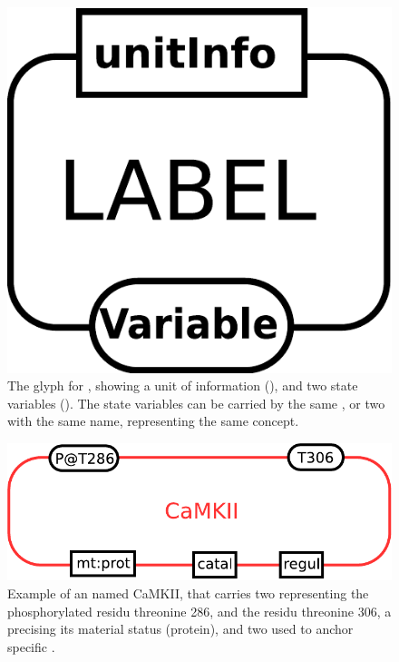 \begin{figure}[H]
  \centering
  \includegraphics[scale = 0.3]{images/entity}
  \caption{The \ER glyph for , showing a unit of information (), and two state variables (). The state variables can be carried by the same , or two  with the same name, representing the same concept.}
  \label{fig:entity}
\end{figure}

\begin{figure}[H]
  \centering
  \includegraphics[scale = 0.5]{examples/ex-entity}
  \caption{Example of an  named CaMKII, that carries two  representing the phosphorylated residu threonine 286, and the residu threonine 306, a  precising its material status (protein), and two  used to anchor specific .}
  \label{fig:ex-entity}
\end{figure}

\normalcolor
